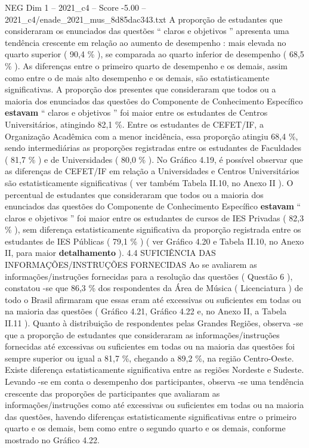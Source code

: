 \begin{textsample}{NEG Dim 1 – 2021\_c4 – Score -5.00 – 2021\_c4/enade\_2021\_mus\_8d85dac343.txt}
A proporção de estudantes que consideraram os enunciados das questões “ claros e objetivos ” apresenta uma tendência crescente em relação ao aumento de desempenho : mais elevada no quarto superior ( 90,4 \% ), se comparada ao quarto inferior de desempenho ( 68,5 \% ).
As diferenças entre o primeiro quarto de desempenho e os demais, assim como entre o de mais alto desempenho e os demais, são estatisticamente significativas.
A proporção dos presentes que consideraram que todos ou a maioria dos enunciados das questões do Componente de Conhecimento Específico \textbf{estavam} “ claros e objetivos ” foi maior entre os estudantes de Centros Universitários, atingindo 82,1 \%.
Entre os estudantes de CEFET/IF, a Organização Acadêmica com a menor incidência, essa proporção atingiu 68,4 \%, sendo intermediárias as proporções registradas entre os estudantes de Faculdades ( 81,7 \% ) e de Universidades ( 80,0 \% ).
No Gráfico 4.19, é possível observar que as diferenças de CEFET/IF em relação a Universidades e Centros Universitários são estatisticamente significativas ( ver também Tabela II.10, no Anexo II ).
O percentual de estudantes que consideraram que todos ou a maioria dos enunciados das questões do Componente de Conhecimento Específico \textbf{estavam} “ claros e objetivos ” foi maior entre os estudantes de cursos de IES Privadas ( 82,3 \% ), sem diferença estatisticamente significativa da proporção registrada entre os estudantes de IES Públicas ( 79,1 \% ) ( ver Gráfico 4.20 e Tabela II.10, no Anexo II, para maior \textbf{detalhamento} ). 4.4 SUFICIÊNCIA DAS INFORMAÇÕES/INSTRUÇÕES FORNECIDAS Ao se avaliarem as informações/instruções fornecidas para a resolução das questões ( Questão 6 ), constatou -se que 86,3 \% dos respondentes da Área de Música ( Licenciatura ) de todo o Brasil afirmaram que essas eram até excessivas ou suficientes em todas ou na maioria das questões ( Gráfico 4.21, Gráfico 4.22 e, no Anexo II, a Tabela II.11 ).
Quanto à distribuição de respondentes pelas Grandes Regiões, observa -se que a proporção de estudantes que consideraram as informações/instruções fornecidas até excessivas ou suficientes em todas ou na maioria das questões foi sempre superior ou igual a 81,7 \%, chegando a 89,2 \%, na região Centro-Oeste.
Existe diferença estatisticamente significativa entre as regiões Nordeste e Sudeste.
Levando -se em conta o desempenho dos participantes, observa -se uma tendência crescente das proporções de participantes que avaliaram as informações/instruções como até excessivas ou suficientes em todas ou na maioria das questões, havendo diferenças estatisticamente significativas entre o primeiro quarto e os demais, bem como entre o segundo quarto e os demais, conforme mostrado no Gráfico 4.22.

\end{textsample}
